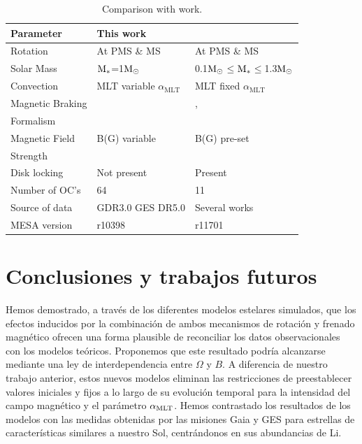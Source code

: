 \begin{table}
	\centering
	\begin{threeparttable}
		\begin{tabular}{lll} 
			\hline
			Parameter & This work & \cite{Gossage2021}\\
			\hline
			
			Rotation & At PMS \& MS & At PMS \& MS\\
			Solar Mass & $\mathrm{M}_*$=1$\mathrm{M}_\odot$ & 0.1$\mathrm{M}_\odot$$\le$$\mathrm{M}_*$$\le$1.3$\mathrm{M}_\odot$ \\
			Convection & MLT variable $\alpha_{\textrm{MLT}}$ & MLT fixed $\alpha_{\textrm{MLT}}$\\
			Magnetic Braking & \cite{Gallet2013} & \cite{Matt2015}, \\ Formalism & & \cite{Garraffo2018}\\
			Magnetic Field & B(G) variable & B(G) pre-set\\ Strength & & \\
			Disk locking & Not present & Present\\
			Number of OC's & 64 & 11 \\
			Source of data & GDR3.0 GES DR5.0 & Several works \\
			MESA version & r10398 & r11701\\
			\hline
		\end{tabular}
	\end{threeparttable}
	\caption{Comparison with \cite{Gossage2021} work.}
	\label{tab:gassage_vs_navarro}    
\end{table}

\section{Conclusiones y trabajos futuros} \label{sec_conclusions}
Hemos demostrado, a través de los diferentes modelos estelares simulados, que los efectos inducidos por la combinación de ambos mecanismos de rotación y frenado magnético ofrecen una forma plausible de reconciliar los datos observacionales con los modelos teóricos. Proponemos que este resultado podría alcanzarse mediante una ley de interdependencia entre $\Omega$ y $B$. A diferencia de nuestro trabajo anterior, estos nuevos modelos eliminan las restricciones de preestablecer valores iniciales y fijos a lo largo de su evolución temporal para la intensidad del campo magnético y el parámetro $\alpha_{\mathrm{MLT}}$. Hemos contrastado los resultados de los modelos con las medidas obtenidas por las misiones Gaia y GES para estrellas de características similares a nuestro Sol, centrándonos en sus abundancias de Li.\par

